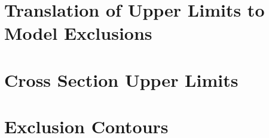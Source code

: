 \documentclass[dissertation.tex]{subfiles}
\begin{document}

\section{Translation of Upper Limits to Model Exclusions}
\label{sec:Translation of Upper Limits to Model Exclusions}

\section{Cross Section Upper Limits}
\label{sec:Cross Section Upper Limits}

\section{Exclusion Contours}
\label{sec:Exclusion Contours}
\end{document}
